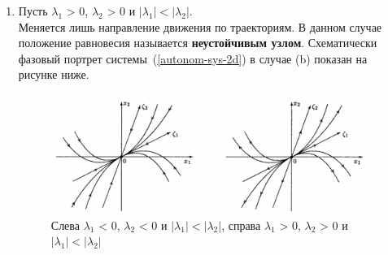 \begin{enumerate}
\begin{enumerate}
    \item Пусть $\lambda_1$ > 0, $\lambda_2$ > 0 и $|\lambda_1| < |\lambda_2|$.\\
        Меняется лишь направление движения по траекториям. В данном случае положение равновесия называется \textbf{неустойчивым узлом}. Схематически фазовый портрет системы~(\ref{autonom-sys-2d}) в случае (b) показан на рисунке ниже.
        \begin{figure}[H]\label{autonom-casea}
            \centering
            \includegraphics[scale=0.8]{sections/Sasha/images/autonom-casea.png}
            \caption{Слева $\lambda_1$ < 0, $\lambda_2$ < 0 и $|\lambda_1| < |\lambda_2|$, справа $\lambda_1$ > 0, $\lambda_2$ > 0 и $|\lambda_1| < |\lambda_2|$}
        \end{figure}
        

\end{enumerate}
\end{enumerate}
